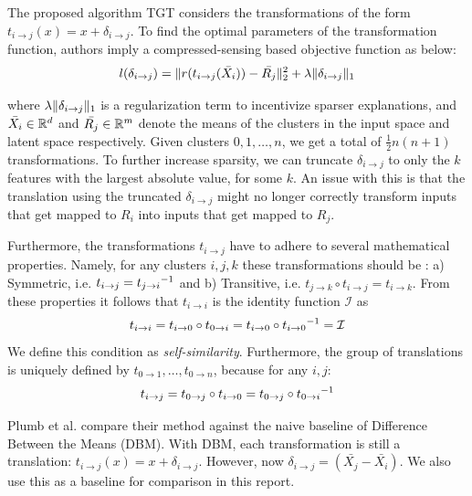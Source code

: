 
The proposed algorithm TGT considers the transformations of the form $t_{i \to j}(x) = x + \delta_{i \to j}$. To find the optimal parameters of the transformation function, authors imply a compressed-sensing based objective function as below:
\begin{equation} \label{loss_function}
   l(\delta_{i \to j}) = \lVert r(t_{i \to j}(\bar{X_i})) - \bar{R_j} \rVert_2^2 + \lambda \lVert \delta_{i \to j} \rVert_1
\end{equation}

where $\lambda \lVert \delta_{i \to j} \rVert_1$ is a regularization term to incentivize sparser explanations, and $\bar{X_i} \in \mathbb{R}^{d}$ and $\bar{R_j} \in \mathbb{R}^{m}$ denote the means of the clusters in the input space and latent space respectively. Given clusters $0, 1, \ldots, n$, we get a total of $\frac{1}{2}n(n+1)$ transformations.
To further increase sparsity, we can truncate $\delta_{i \to j}$ to only the $k$ features with the largest absolute value, for some $k$. An issue with this is that the translation using the  truncated $\delta_{i \to j}$ might no longer correctly transform inputs that get mapped to $R_i$ into inputs that get mapped to $R_j$.

Furthermore, the transformations $t_{i \to j}$ have to adhere to several mathematical properties. Namely, for any clusters $i, j, k$ these transformations should be : a) Symmetric, i.e. $t_{i \to j} = {t_{j \to i}}^{-1}$
and b) Transitive, i.e. $t_{j \to k} \circ t_{i \to j} = t_{i \to k}$. From these properties it follows that $t_{i \to i}$ is the identity function $\mathcal{I}$ as
\begin{equation}
   t_{i \to i} = t_{i \to 0} \circ t_{0 \to i} = t_{i \to 0} \circ {t_{i \to 0}}^{-1} = \mathcal{I}  
\end{equation}
We define this condition as \textit{self-similarity}. Furthermore, the group of translations is uniquely defined by $t_{0 \to 1}, \ldots, t_{0 \to n}$, because for any $i, j$:
\begin{equation}
t_{i \to j} = t_{0 \to j} \circ t_{i \to 0} = t_{0 \to j} \circ {t_{0 \to i}}^{-1}
\end{equation}

Plumb et al. \cite{plumb2020explaining} compare their method against the naive baseline of Difference Between the Means (DBM). With DBM, each transformation is still a translation: $t_{i \to j}(x) = x + \delta_{i \to j}$. However, now $\delta_{i \to j} = (\bar{X_j} - \bar{X_i})$. We also use this as a baseline for comparison in this report. 

